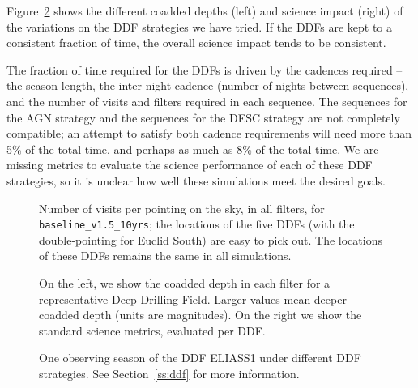 Figure~\ref{fig:ddf_differences} shows the different coadded depths (left) and science impact (right) of the variations on the DDF strategies we have tried. If the DDFs are kept to a consistent fraction of time, the overall science impact tends to be consistent. 

The fraction of time required for the DDFs is driven by the cadences required -- the season length, the inter-night cadence (number of nights between sequences), and the number of visits and filters required in each sequence. The sequences for the AGN strategy and the sequences for the DESC strategy are not completely compatible; an attempt to satisfy both cadence requirements will need more than 5\% of the total time, and perhaps as much as 8\% of the total time. We are missing metrics to evaluate the science performance of each of these DDF strategies, so it is unclear how well these simulations meet the desired goals. 

\begin{figure}
\caption{Number of visits per pointing on the sky, in all filters, for {\tt baseline\_v1.5\_10yrs}; the locations of the five DDFs (with the double-pointing for Euclid South) are easy to pick out. The locations of these DDFs remains the same in all simulations.} \label{fig:ddf_locs}
\end{figure}

\begin{figure}
\caption{On the left, we show the coadded depth in each filter for a representative Deep Drilling Field. Larger values mean deeper coadded depth (units are magnitudes). On the right we show the standard science metrics, evaluated per DDF.}\label{fig:ddf_differences}
\end{figure}

\begin{figure}
\caption{One observing season of the DDF ELIASS1 under different DDF strategies. See Section~\ref{ss:ddf} for more information. }\label{fig:ddfexamples}
\end{figure}



